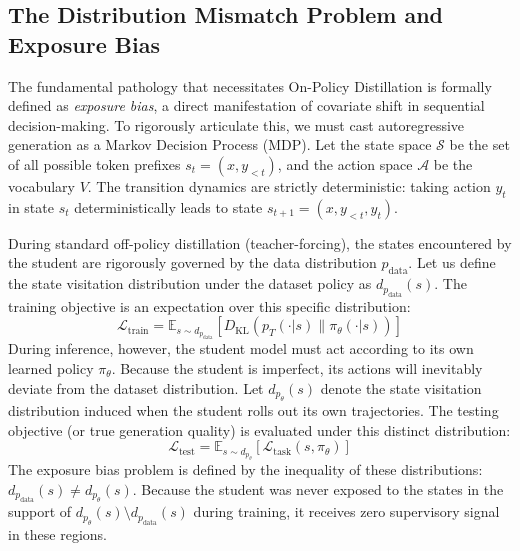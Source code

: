 \documentclass{article} %
\newcommand{\KL}{D_{\mathrm{KL}}}
\newcommand{\ptheta}{p_\theta}
\newcommand{\pteacher}{p_T}
\newcommand{\pdata}{p_{\mathrm{data}}}
\newcommand{\loss}{\mathcal{L}}
\begin{document}
\subsection{The Distribution Mismatch Problem and Exposure Bias}
\label{subsec:exposure_bias}

The fundamental pathology that necessitates On-Policy Distillation is formally defined as \textit{exposure bias}, a direct manifestation of covariate shift in sequential decision-making. To rigorously articulate this, we must cast autoregressive generation as a Markov Decision Process (MDP). Let the state space $\mathcal{S}$ be the set of all possible token prefixes $s_t = (x, y_{<t})$, and the action space $\mathcal{A}$ be the vocabulary $V$. The transition dynamics are strictly deterministic: taking action $y_t$ in state $s_t$ deterministically leads to state $s_{t+1} = (x, y_{<t}, y_t)$. 

During standard off-policy distillation (teacher-forcing), the states encountered by the student are rigorously governed by the data distribution $\pdata$. Let us define the state visitation distribution under the dataset policy as $d_{\pdata}(s)$. The training objective is an expectation over this specific distribution:
\begin{equation}
    \loss_{\mathrm{train}} = \mathbb{E}_{s \sim d_{\pdata}} \left[ \KL(\pteacher(\cdot|s) \parallel \pi_\theta(\cdot|s)) \right]
\end{equation}
During inference, however, the student model must act according to its own learned policy $\pi_\theta$. Because the student is imperfect, its actions will inevitably deviate from the dataset distribution. Let $d_{\ptheta}(s)$ denote the state visitation distribution induced when the student rolls out its own trajectories. The testing objective (or true generation quality) is evaluated under this distinct distribution:
\begin{equation}
    \loss_{\mathrm{test}} = \mathbb{E}_{s \sim d_{\ptheta}} \left[ \loss_{\mathrm{task}}(s, \pi_\theta) \right]
\end{equation}
The exposure bias problem is defined by the inequality of these distributions: $d_{\pdata}(s) \neq d_{\ptheta}(s)$. Because the student was never exposed to the states in the support of $d_{\ptheta}(s) \setminus d_{\pdata}(s)$ during training, it receives zero supervisory signal in these regions. 
\end{document}
